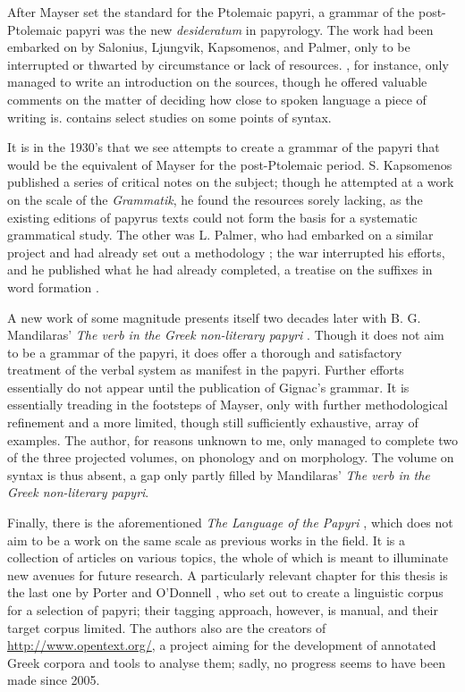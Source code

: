 After Mayser set the standard for the Ptolemaic papyri, a grammar of
the post-Ptolemaic papyri was the new \textit{desideratum} in
papyrology. The work had been embarked on by Salonius, Ljungvik,
Kapsomenos, and Palmer, only to be interrupted or thwarted by
circumstance or lack of resources.  \cite{salonius1927}, for
instance, only managed to write an introduction on the sources, though
he offered valuable comments on the matter of deciding how close to
spoken language a piece of writing is. \cite{ljungvik1932} contains
select studies on some points of syntax.

It is in the 1930's that we see attempts to create a grammar of the
papyri that would be the equivalent of Mayser for the post-Ptolemaic
period.  S. Kapsomenos published a series of critical
notes \citep{kapsomenos1938,kapsomenos1957} on the
subject; though he attempted at a work on the scale of the
\textit{Grammatik}, he found the resources sorely lacking, as the
existing editions of papyrus texts could not form the basis for a
systematic grammatical study. The other was L. Palmer,
who had embarked on a similar project and had already set out a
methodology \citep{palmer1934}; the war interrupted his efforts,
and he published what he had already completed, a treatise on the
suffixes in word formation \citep{palmer1945}.

A new work of some magnitude presents itself two decades later with
B. G.  Mandilaras' \textit{The verb in the Greek non-literary papyri}
\citep{mandilaras1973}. Though it does not aim to be a grammar of
the papyri, it does offer a thorough and satisfactory treatment of the
verbal system as manifest in the papyri.  Further efforts essentially
do not appear until the publication of Gignac's grammar. It is
essentially treading in the footsteps of Mayser, only with further
methodological refinement and a more limited, though still
sufficiently exhaustive, array of examples. The author, for reasons
unknown to me, only managed to complete two of the three projected
volumes, on phonology and on morphology. The volume on syntax is thus
absent, a gap only partly filled by Mandilaras' \textit{The verb in
  the Greek non-literary papyri}.

Finally, there is the aforementioned \textit{The Language of the
Papyri} \citep{lpapyri}, which does not aim to be a work on the same
scale as previous works in the field. It is a collection of articles
on various topics, the whole of which is meant to illuminate new
avenues for future research. A particularly relevant chapter for this
thesis is the last one by Porter and O'Donnell \citep{porter2010}, who
set out to create a linguistic corpus for a selection of papyri; their
tagging approach, however, is manual, and their target corpus
limited. The authors also are the creators of
\url{http://www.opentext.org/}, a project aiming for the development
of annotated Greek corpora and tools to analyse them; sadly, no
progress seems to have been made since 2005.


